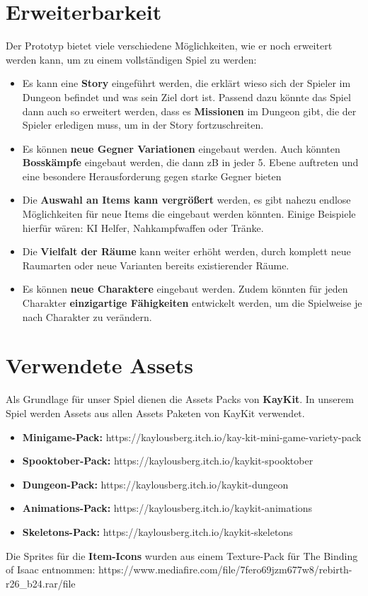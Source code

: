 \section{Erweiterbarkeit}
Der Prototyp bietet viele verschiedene Möglichkeiten, wie er noch erweitert werden kann, um zu einem vollständigen Spiel zu werden:
\begin{itemize}
\item Es kann eine \textbf{Story} eingeführt werden, die erklärt wieso sich der Spieler im Dungeon befindet und was sein Ziel dort ist. Passend dazu könnte das Spiel dann auch so erweitert werden, dass es \textbf{Missionen} im Dungeon gibt, die der Spieler erledigen muss, um in der Story fortzuschreiten.
\item Es können \textbf{neue Gegner Variationen} eingebaut werden. Auch könnten \textbf{Bosskämpfe} eingebaut werden, die dann zB in jeder 5. Ebene auftreten und eine besondere Herausforderung gegen starke Gegner bieten
\item Die \textbf{Auswahl an Items kann vergrößert} werden, es gibt nahezu endlose Möglichkeiten für neue Items die eingebaut werden könnten. Einige Beispiele hierfür wären: KI Helfer, Nahkampfwaffen oder Tränke.
\item Die \textbf{Vielfalt der Räume} kann weiter erhöht werden, durch komplett neue Raumarten oder neue Varianten bereits existierender Räume.
\item Es können \textbf{neue Charaktere} eingebaut werden. Zudem könnten für jeden Charakter \textbf{einzigartige Fähigkeiten} entwickelt werden, um die Spielweise je nach Charakter zu verändern.
\end{itemize}

\section{Verwendete Assets}

Als Grundlage für unser Spiel dienen die Assets Packs von \textbf{KayKit}. In unserem Spiel werden Assets aus allen Assets Paketen von KayKit verwendet.
\begin{itemize}
\item \textbf{Minigame-Pack:} https://kaylousberg.itch.io/kay-kit-mini-game-variety-pack
\item \textbf{Spooktober-Pack:} https://kaylousberg.itch.io/kaykit-spooktober
\item \textbf{Dungeon-Pack:} https://kaylousberg.itch.io/kaykit-dungeon
\item \textbf{Animations-Pack:} https://kaylousberg.itch.io/kaykit-animations
\item \textbf{Skeletons-Pack:} https://kaylousberg.itch.io/kaykit-skeletons
\end{itemize}

Die Sprites für die \textbf{Item-Icons} wurden aus einem Texture-Pack für The Binding of Isaac entnommen: https://www.mediafire.com/file/7fero69jzm677w8/rebirth-r26\_b24.rar/file



